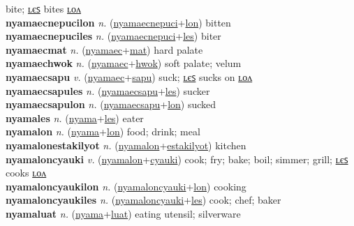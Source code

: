 bite; \hyperref[nyamaecnepuciles]{ʟєꜱ} bites \hyperref[nyamaecnepucilon]{ʟᴏᴧ} \label{nyamaecnepuci} \\
\textbf{nyamaecnepucilon} \textit{n.} (\hyperref[nyamaecnepuci]{nyamaecnepuci}+\hyperref[lon]{lon})
bitten \label{nyamaecnepucilon} \\
\textbf{nyamaecnepuciles} \textit{n.} (\hyperref[nyamaecnepuci]{nyamaecnepuci}+\hyperref[les]{les})
biter \label{nyamaecnepuciles} \\
\textbf{nyamaecmat} \textit{n.} (\hyperref[nyamaec]{nyamaec}+\hyperref[mat]{mat})
hard palate \label{nyamaecmat} \\
\textbf{nyamaechwok} \textit{n.} (\hyperref[nyamaec]{nyamaec}+\hyperref[hwok]{hwok})
soft palate; velum \label{nyamaechwok} \\
\textbf{nyamaecsapu} \textit{v.} (\hyperref[nyamaec]{nyamaec}+\hyperref[sapu]{sapu})
suck; \hyperref[nyamaecsapules]{ʟєꜱ} sucks on \hyperref[nyamaecsapulon]{ʟᴏᴧ} \label{nyamaecsapu} \\
\textbf{nyamaecsapules} \textit{n.} (\hyperref[nyamaecsapu]{nyamaecsapu}+\hyperref[les]{les})
sucker \label{nyamaecsapules} \\
\textbf{nyamaecsapulon} \textit{n.} (\hyperref[nyamaecsapu]{nyamaecsapu}+\hyperref[lon]{lon})
sucked \label{nyamaecsapulon} \\
\textbf{nyamales} \textit{n.} (\hyperref[nyama]{nyama}+\hyperref[les]{les})
eater \label{nyamales} \\
\textbf{nyamalon} \textit{n.} (\hyperref[nyama]{nyama}+\hyperref[lon]{lon})
food; drink; meal \label{nyamalon} \\
\textbf{nyamalonestakilyot} \textit{n.} (\hyperref[nyamalon]{nyamalon}+\hyperref[estakilyot]{estakilyot})
kitchen \label{nyamalonestakilyot} \\
\textbf{nyamaloncyauki} \textit{v.} (\hyperref[nyamalon]{nyamalon}+\hyperref[cyauki]{cyauki})
cook; fry; bake; boil; simmer; grill; \hyperref[nyamaloncyaukiles]{ʟєꜱ} cooks \hyperref[nyamaloncyaukilon]{ʟᴏᴧ} \label{nyamaloncyauki} \\
\textbf{nyamaloncyaukilon} \textit{n.} (\hyperref[nyamaloncyauki]{nyamaloncyauki}+\hyperref[lon]{lon})
cooking \label{nyamaloncyaukilon} \\
\textbf{nyamaloncyaukiles} \textit{n.} (\hyperref[nyamaloncyauki]{nyamaloncyauki}+\hyperref[les]{les})
cook; chef; baker \label{nyamaloncyaukiles} \\
\textbf{nyamaluat} \textit{n.} (\hyperref[nyama]{nyama}+\hyperref[luat]{luat})
eating utensil; silverware \label{nyamaluat} \\
